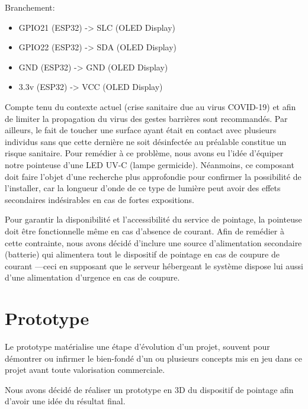 Branchement: 
\begin{itemize}
    \item [\textbullet]GPIO21 (ESP32) -> SLC (OLED Display)
    \item [\textbullet]GPIO22 (ESP32) -> SDA (OLED Display)
    \item [\textbullet]GND (ESP32) -> GND (OLED Display) 
    \item [\textbullet]3.3v (ESP32) -> VCC (OLED Display)
\end{itemize}    

Compte tenu du contexte actuel (crise sanitaire due au virus COVID-19) et afin 
de limiter la propagation du virus des gestes barrières sont recommandés. Par 
ailleurs, le fait de toucher une surface ayant était en contact avec plusieurs 
individus sans que cette dernière ne soit désinfectée au préalable constitue un 
risque sanitaire. Pour remédier à ce problème, nous avons eu l'idée d’équiper 
notre pointeuse d’une LED UV-C (lampe germicide). Néanmoins, ce composant doit 
faire l’objet d’une recherche plus approfondie pour confirmer la possibilité 
de l’installer, car la longueur d’onde de ce type de lumière peut avoir des 
effets secondaires indésirables en cas de fortes expositions.

Pour garantir la disponibilité et l’accessibilité du service de pointage, la 
pointeuse doit être fonctionnelle même en cas d’absence de courant. Afin de 
remédier à cette contrainte, nous avons décidé d’inclure une source 
d’alimentation secondaire (batterie) qui alimentera tout le dispositif de 
pointage en cas de coupure de courant ---ceci en supposant que le serveur
hébergeant le système dispose lui aussi d’une alimentation d’urgence en cas de
coupure.    

\section{Prototype}
Le prototype matérialise une étape d’évolution d’un projet, souvent pour
démontrer ou infirmer le bien-fondé d’un ou plusieurs concepts mis en jeu dans
ce projet avant toute valorisation commerciale.

Nous avons décidé de réaliser un prototype en 3D du dispositif de pointage afin 
d’avoir une idée du résultat final.\\


